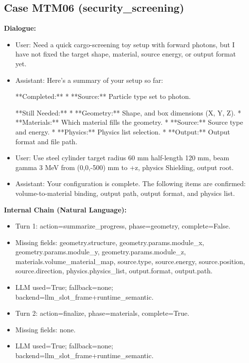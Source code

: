 \documentclass[11pt]{ctexart}
\begin{document}
\subsection{Case MTM06 (security\_screening)}
\textbf{Dialogue:}
\begin{itemize}
\item User: Need a quick cargo-screening toy setup with forward photons, but I have not fixed the target shape, material, source energy, or output format yet.
\item Assistant: Here's a summary of your setup so far:

**Completed:**
*   **Source:** Particle type set to photon.

**Still Needed:**
*   **Geometry:** Shape, and box dimensions (X, Y, Z).
*   **Materials:** Which material fills the geometry.
*   **Source:** Source type and energy.
*   **Physics:** Physics list selection.
*   **Output:** Output format and file path.
\item User: Use steel cylinder target radius 60 mm half-length 120 mm, beam gamma 3 MeV from (0,0,-500) mm to +z, physics Shielding, output root.
\item Assistant: Your configuration is complete. The following items are confirmed: volume-to-material binding, output path, output format, and physics list.
\end{itemize}
\textbf{Internal Chain (Natural Language):}
\begin{itemize}
\item Turn 1: action=summarize\_progress, phase=geometry, complete=False.
\item Missing fields: geometry.structure, geometry.params.module\_x, geometry.params.module\_y, geometry.params.module\_z, materials.volume\_material\_map, source.type, source.energy, source.position, source.direction, physics.physics\_list, output.format, output.path.
\item LLM used=True; fallback=none; backend=llm\_slot\_frame+runtime\_semantic.
\item Turn 2: action=finalize, phase=materials, complete=True.
\item Missing fields: none.
\item LLM used=True; fallback=none; backend=llm\_slot\_frame+runtime\_semantic.
\end{itemize}
\end{document}
